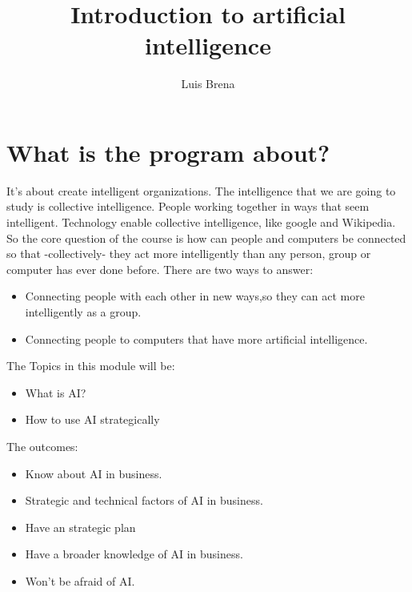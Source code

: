 \documentclass{article}
\title{Introduction to artificial intelligence}
\date{}
\author{Luis Brena}
\begin{document}
  \maketitle
  \newpage
\section{What is the program about?}
It's about create intelligent organizations. The intelligence that we are going to study is collective intelligence. People working together in ways that seem intelligent.
Technology enable collective intelligence, like google and Wikipedia.
So the core question of the course is how can people and computers be connected so that -collectively- they act more intelligently than any person, group or computer has ever done before.
There are two ways to answer:
  \begin{itemize}
    \item Connecting people with each other in new ways,so they can act more intelligently as a group.
    \item Connecting people to computers that have more artificial intelligence.
  \end{itemize}
The Topics in this module will be:
  \begin{itemize}
    \item What is AI?
    \item How to use AI strategically
  \end{itemize}
The outcomes:
  \begin{itemize}
  	\item Know about AI in business.
  	\item Strategic and technical factors of AI in business.
  	\item Have an strategic plan
  	\item Have a broader knowledge of AI in business.
  	\item Won't be afraid of AI.
  \end{itemize}
\end{document}
